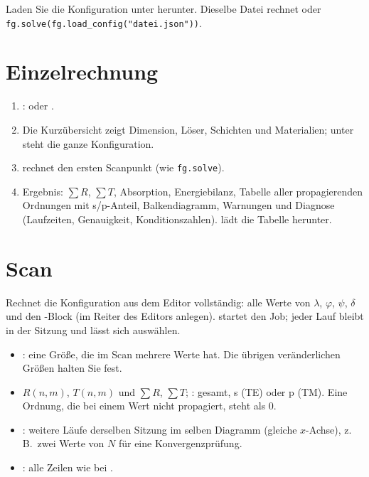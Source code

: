 \begin{tipp}
Laden Sie die Konfiguration unter  herunter. Dieselbe Datei rechnet  oder
\texttt{fg.solve(fg.load\_config("datei.json"))}.
\end{tipp}

\section{Einzelrechnung}
\begin{enumerate}
  \item {}:  oder .
  \item Die Kurzübersicht zeigt Dimension, Löser, Schichten und Materialien; unter  steht die ganze
        Konfiguration.
  \item {} rechnet den ersten Scanpunkt (wie \texttt{fg.solve}).
  \item Ergebnis: $\sum R$, $\sum T$, Absorption, Energiebilanz, Tabelle aller propagierenden Ordnungen mit s/p-Anteil,
        Balkendiagramm, Warnungen und Diagnose (Laufzeiten, Genauigkeit, Konditionszahlen). 
        lädt die Tabelle herunter.
\end{enumerate}

\section{Scan}
Rechnet die Konfiguration aus dem Editor vollständig: alle Werte von $\lambda$, $\varphi$, $\psi$, $\delta$ und den
-Block (im Reiter  des Editors anlegen).  startet den Job; jeder Lauf bleibt in
der Sitzung und lässt sich auswählen.
\begin{itemize}
  \item {}: eine Größe, die im Scan mehrere Werte hat. Die übrigen veränderlichen Größen halten Sie fest.
  \item {} $R(n,m)$, $T(n,m)$ und  $\sum R$, $\sum T$; : gesamt, s (TE) oder p (TM).
        Eine Ordnung, die bei einem Wert nicht propagiert, steht als 0.
  \item {}: weitere Läufe derselben Sitzung im selben Diagramm (gleiche $x$-Achse), z.\,B.\ zwei
        Werte von $N$ für eine Konvergenzprüfung.
  \item {}: alle Zeilen wie bei .
\end{itemize}

